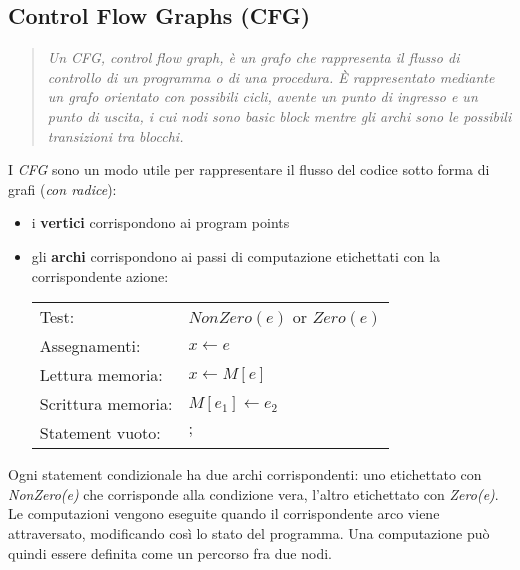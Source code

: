 \documentclass[a4paper,12pt,openany]{article}
\begin{document}
\subsection{Control Flow Graphs (CFG)}

\begin{quotation}\small
\textit{Un CFG, control flow graph, è un grafo che rappresenta il flusso di controllo di un programma o di una procedura. È rappresentato mediante un grafo orientato con possibili cicli, avente un punto di ingresso e un punto di uscita, i cui nodi sono basic block mentre gli archi sono le possibili transizioni tra blocchi. }
\end{quotation}

I \emph{CFG} sono un modo utile per rappresentare il flusso del codice sotto forma di grafi (\emph{con 
radice}):
\begin{itemize}
    \item i \textbf{vertici} corrispondono ai program points
    \item gli \textbf{archi} corrispondono ai passi di computazione etichettati con la corrispondente
        azione:
        \begin{center}
        	\begin{tabular}{l l}
        		Test: & $NonZero(e)$ or $Zero(e)$ \\
        		Assegnamenti: & $x \gets e$ \\
        		Lettura memoria: & $x \gets M[e]$ \\
        		Scrittura memoria: & $M[e_1] \gets e_2$ \\
        		Statement vuoto: & $;$ \\
        	\end{tabular}
        \end{center}
\end{itemize}
Ogni statement condizionale ha due archi corrispondenti: uno etichettato con \emph{NonZero(e)} che corrisponde
alla condizione vera, l'altro etichettato con \emph{Zero(e)}.
\newline
Le computazioni vengono eseguite quando il corrispondente arco viene attraversato, modificando così lo stato
del programma. Una computazione può quindi essere definita come un percorso fra due nodi.
\end{document}
